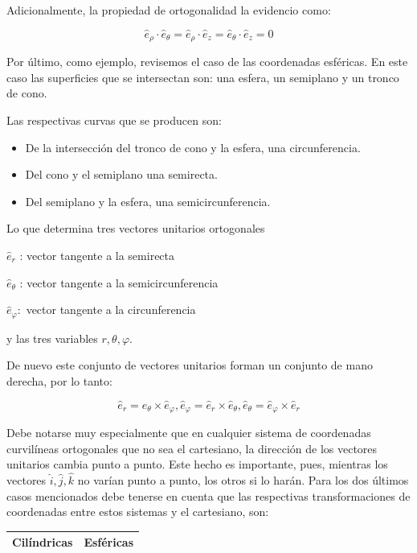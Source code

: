 Adicionalmente, la propiedad de ortogonalidad la evidencio como:

$$
\widehat{e}_{\rho} \cdot \widehat{e}_{\theta}=\widehat{e}_{\rho} \cdot \widehat{e}_{z}=\widehat{e}_{\theta} \cdot \hat{e}_{z}=0
$$

Por último, como ejemplo, revisemos el caso de las coordenadas esféricas. En este caso las superficies que se intersectan son: una esfera, un semiplano y un tronco de cono.

Las respectivas curvas que se producen son:

\begin{itemize}
  \item De la intersección del tronco de cono y la esfera, una circunferencia.

  \item Del cono y el semiplano una semirecta.

  \item Del semiplano y la esfera, una semicircunferencia.

\end{itemize}

Lo que determina tres vectores unitarios ortogonales

$\hat{e}_{r}$ : vector tangente a la semirecta

$\hat{e}_{\theta}$ : vector tangente a la semicircunferencia

$\hat{e}_{\varphi}:$ vector tangente a la circunferencia

y las tres variables $r, \theta, \varphi$.

De nuevo este conjunto de vectores unitarios forman un conjunto de mano derecha, por lo tanto:

$$
\widehat{e}_{r}=\widehat{e}_{\theta} \times \hat{e}_{\varphi}, \hat{e}_{\varphi}=\widehat{e}_{r} \times \widehat{e}_{\theta}, \widehat{e}_{\theta}=\hat{e}_{\varphi} \times \hat{e}_{r}
$$

Debe notarse muy especialmente que en cualquier sistema de coordenadas curvilíneas ortogonales que no sea el cartesiano, la dirección de los vectores unitarios cambia punto a punto. Este hecho es importante, pues, mientras los vectores $\hat{i}, \hat{j}, \hat{k}$ no varían punto a punto, los otros si lo harán. Para los dos últimos casos mencionados debe tenerse en cuenta que las respectivas transformaciones de coordenadas entre estos sistemas y el cartesiano, son:

\begin{center}
\begin{tabular}{|l|l|}
\hline
Cilíndricas & Esféricas \\
\hline
\end{tabular}
\end{center}

